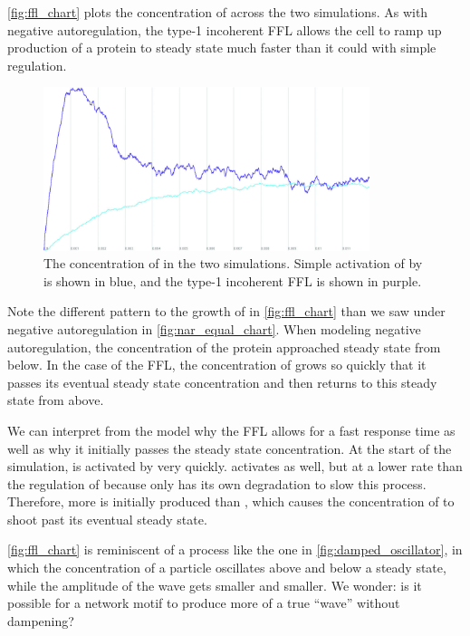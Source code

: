 \autoref{fig:ffl_chart} plots the concentration of  across the two simulations. As with negative autoregulation, the type-1 incoherent FFL allows the cell to ramp up production of a protein  to steady state much faster than it could with simple regulation.\\

\begin{figure}[h]
\centering
\mySfFamily
\includegraphics[width = 0.85\textwidth]{../images_CMYK/cellblender_ffl_white}
\caption{The concentration of  in the two simulations. Simple activation of  by  is shown in blue, and the type-1 incoherent FFL is shown in purple.}
\label{fig:ffl_chart}
\end{figure}

Note the different pattern to the growth of  in \autoref{fig:ffl_chart} than we saw under negative autoregulation in \autoref{fig:nar_equal_chart}. When modeling negative autoregulation, the concentration of the protein approached steady state from below. In the case of the FFL, the concentration of  grows so quickly that it passes its eventual steady state concentration and then returns to this steady state from above.

We can interpret from the model why the FFL allows for a fast response time as well as why it initially passes the steady state concentration. At the start of the simulation,  is activated by  very quickly.  activates  as well, but at a lower rate than the regulation of  because  only has its own degradation to slow this process. Therefore, more  is initially produced than , which causes the concentration of  to shoot past its eventual steady state.

\autoref{fig:ffl_chart} is reminiscent of a  process like the one in \autoref{fig:damped_oscillator}, in which the concentration of a particle oscillates above and below a steady state, while the amplitude of the wave gets smaller and smaller. We wonder: is it possible for a network motif to produce more of a true ``wave'' without dampening?\\

